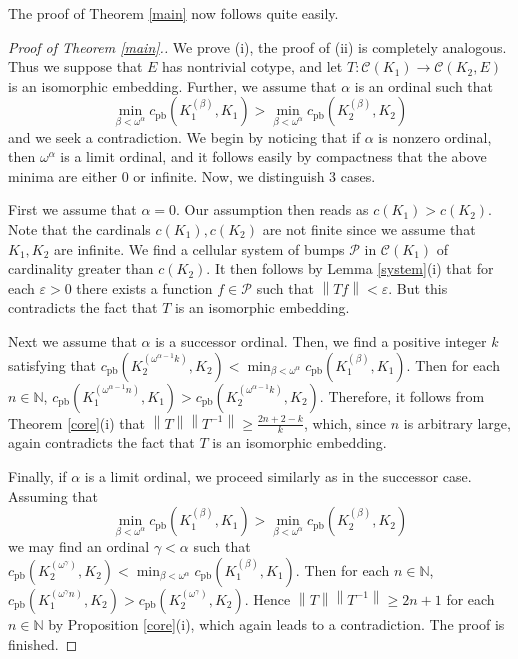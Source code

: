 \documentclass{amsart}
\numberwithin{equation}{section}
\theoremstyle{definition}
\def\C{\mathcal C}
\def\ep{\varepsilon}
\def\en{\mathbb N}
\newcommand{\norm}[1]{\left\|#1\right\|}
\begin{document}
The proof of Theorem \ref{main} now follows quite easily.

\begin{proof}[Proof of Theorem \ref{main}.]
We prove (i), the proof of (ii) is completely analogous. Thus we suppose that $E$ has nontrivial cotype, and let $T:\C(K_1) \rightarrow \C(K_2, E)$ is an isomorphic embedding. Further, we assume that $\alpha$ is an ordinal such that
\[\min_{\beta<\omega^{\alpha}} c_{\text{pb}}(K_1^{(\beta)}, K_1) > \min_{\beta<\omega^{\alpha}} c_{\text{pb}}(K_2^{(\beta)}, K_2)\]
and we seek a contradiction. We begin by noticing that if $\alpha$ is nonzero ordinal, then $\omega^{\alpha}$ is a limit ordinal, and it follows easily by compactness that the above minima are either $0$ or infinite.
Now, we distinguish $3$ cases. 

First we assume that $\alpha=0$. Our assumption then reads as $c(K_1)>c(K_2)$. Note that the cardinals $c(K_1), c(K_2)$ are not finite since we assume that $K_1, K_2$ are infinite. We find a cellular system of bumps $\mathcal{P}$ in $\C(K_1)$ of cardinality greater than $c(K_2)$. It then follows by Lemma \ref{system}(i) that for each $\ep>0$ there exists a function $f \in \mathcal{P}$ such that $\norm{Tf}<\ep$. But this contradicts the fact that $T$ is an isomorphic embedding.

Next we assume that $\alpha$ is a successor ordinal. Then, we find a positive integer $k$ satisfying that $c_{\text{pb}}(K_2^{(\omega^{\alpha-1}k)}, K_2)<\min_{\beta<\omega^{\alpha}} c_{\text{pb}}(K_1^{(\beta)}, K_1)$. Then for each $n \in \en$, $c_{\text{pb}}(K_1^{(\omega^{\alpha-1}n)}, K_1)>c_{\text{pb}}(K_2^{(\omega^{\alpha-1}k)}, K_2)$. Therefore, it follows from Theorem \ref{core}(i) that $\norm{T}\norm{T^{-1}} \geq \frac{2n+2-k}{k}$, which, since $n$ is arbitrary large, again contradicts the fact that $T$ is an isomorphic embedding. 

Finally, if $\alpha$ is a limit ordinal, we proceed similarly as in the successor case. Assuming that 
\[\min_{\beta<\omega^{\alpha}} c_{\text{pb}}(K_1^{(\beta)}, K_1) > \min_{\beta<\omega^{\alpha}} c_{\text{pb}}(K_2^{(\beta)}, K_2)\]
we may find an ordinal $\gamma<\alpha$ such that $c_{\text{pb}}(K_2^{(\omega^{\gamma})}, K_2)<\min_{\beta<\omega^{\alpha}} c_{\text{pb}}(K_1^{(\beta)}, K_1)$. Then for each $n \in \en$, $c_{\text{pb}}(K_1^{(\omega^{\gamma}n)}, K_2)>c_{\text{pb}}(K_2^{(\omega^{\gamma})}, K_2)$. Hence
$\norm{T}\norm{T^{-1}} \geq 2n+1$ for each $n \in \en$ by Proposition \ref{core}(i), which again leads to a contradiction. The proof is finished.
\end{proof}
\end{document}
